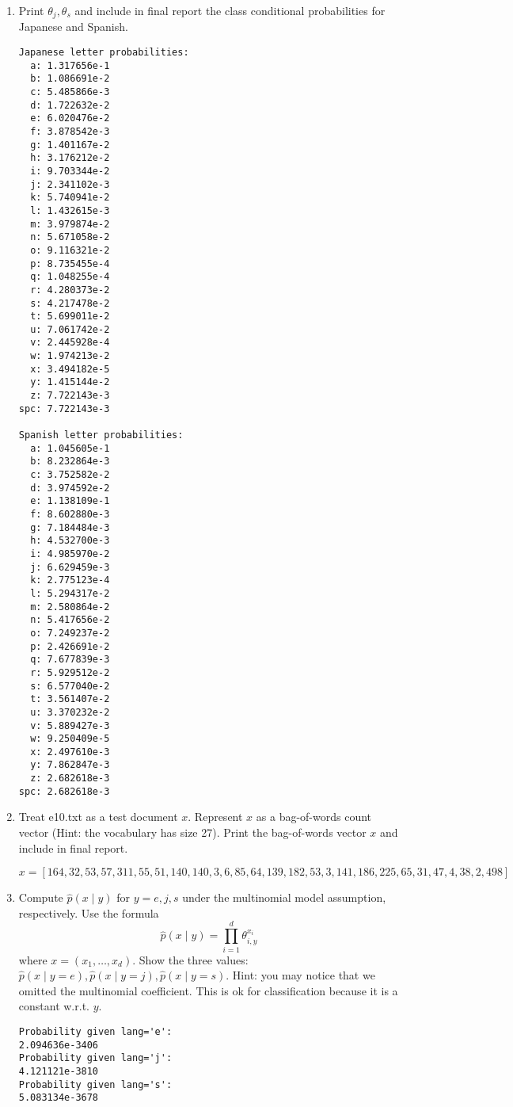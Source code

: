 \documentclass[a4paper]{article}
\theoremstyle{definition}
\newenvironment{soln}{
    \leavevmode\color{blue}\ignorespaces
}{}
\begin{document}
\begin{enumerate}
\item
Print $\theta_j, \theta_s$ and include in final report the class conditional probabilities for Japanese and Spanish.

\begin{soln}
\begin{verbatim}
Japanese letter probabilities:
  a: 1.317656e-1
  b: 1.086691e-2
  c: 5.485866e-3
  d: 1.722632e-2
  e: 6.020476e-2
  f: 3.878542e-3
  g: 1.401167e-2
  h: 3.176212e-2
  i: 9.703344e-2
  j: 2.341102e-3
  k: 5.740941e-2
  l: 1.432615e-3
  m: 3.979874e-2
  n: 5.671058e-2
  o: 9.116321e-2
  p: 8.735455e-4
  q: 1.048255e-4
  r: 4.280373e-2
  s: 4.217478e-2
  t: 5.699011e-2
  u: 7.061742e-2
  v: 2.445928e-4
  w: 1.974213e-2
  x: 3.494182e-5
  y: 1.415144e-2
  z: 7.722143e-3
spc: 7.722143e-3
 
Spanish letter probabilities:
  a: 1.045605e-1
  b: 8.232864e-3
  c: 3.752582e-2
  d: 3.974592e-2
  e: 1.138109e-1
  f: 8.602880e-3
  g: 7.184484e-3
  h: 4.532700e-3
  i: 4.985970e-2
  j: 6.629459e-3
  k: 2.775123e-4
  l: 5.294317e-2
  m: 2.580864e-2
  n: 5.417656e-2
  o: 7.249237e-2
  p: 2.426691e-2
  q: 7.677839e-3
  r: 5.929512e-2
  s: 6.577040e-2
  t: 3.561407e-2
  u: 3.370232e-2
  v: 5.889427e-3
  w: 9.250409e-5
  x: 2.497610e-3
  y: 7.862847e-3
  z: 2.682618e-3
spc: 2.682618e-3
\end{verbatim}
\end{soln}

\item
Treat e10.txt as a test document $x$.
Represent $x$ as a bag-of-words count vector (Hint: the vocabulary has size 27).
Print the bag-of-words vector $x$ and include in final report.

\begin{soln}
\[ x=[164, 32, 53, 57, 311, 55, 51, 140, 140, 3, 6, 85, 64, 139, 182, 53, 3, 141, 186, 225, 65, 31, 47, 4, 38, 2, 498] \]
\end{soln}

\item
Compute $\hat p(x \mid y)$ for $y=e, j, s$ under the multinomial model assumption, respectively.
Use the formula
$$\hat p(x \mid y) = \prod_{i=1}^d \theta_{i, y}^{x_i}$$
where $x=(x_1, \ldots, x_d)$.
Show the three values: $\hat p(x \mid y=e), \hat p(x \mid y=j), \hat p(x \mid y=s)$.
Hint: you may notice that we omitted the multinomial coefficient.  This is ok for classification because it is a constant w.r.t. $y$.

\begin{soln}
\begin{verbatim}
Probability given lang='e':
2.094636e-3406
Probability given lang='j':
4.121121e-3810
Probability given lang='s':
5.083134e-3678
\end{verbatim}


\end{soln}
\end{enumerate}
\end{document}
